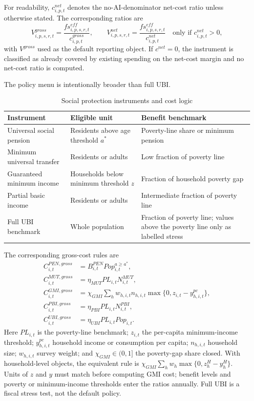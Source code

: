 \documentclass[11pt,a4paper]{article}
\begin{document}
For readability, $c^{net}_{i,p,t}$ denotes the no-AI-denominator net-cost ratio unless otherwise stated. The corresponding ratios are
\begin{equation}
    V^{gross}_{i,p,s,r,t}=\frac{fs^{eff}_{i,p,s,r,t}}{c^{gross}_{i,p,t}},
    \qquad
    V^{net}_{i,p,s,r,t}=\frac{fs^{eff}_{i,p,s,r,t}}{c^{net}_{i,p,t}}\quad\text{only if }c^{net}_{i,p,t}>0,
\end{equation}
with $V^{gross}$ used as the default reporting object. If $c^{net}=0$, the instrument is classified as already covered by existing spending on the net-cost margin and no net-cost ratio is computed.

The policy menu is intentionally broader than full UBI.

\begin{table}[H]
\centering
\caption{Social protection instruments and cost logic}
\label{tab:policy_rules}
\small
\begin{tabular}{p{}p{}p{}}
\toprule
Instrument & Eligible unit & Benefit benchmark \\
\midrule
Universal social pension & Residents above age threshold $a^*$ & Poverty-line share or minimum pension \\
Minimum universal transfer & Residents or adults & Low fraction of poverty line \\
Guaranteed minimum income & Households below minimum threshold $z$ & Fraction of household poverty gap \\
Partial basic income & Residents or adults & Intermediate fraction of poverty line \\
Full UBI benchmark & Whole population & Fraction of poverty line; values above the poverty line only as labelled stress \\
\bottomrule
\end{tabular}
\end{table}

The corresponding gross-cost rules are
\begin{align}
    C^{PEN,gross}_{i,t} &= B^{PEN}_{i,t}Pop_{i,t}^{a\geq a^*},\\
    C^{MUT,gross}_{i,t} &= \eta_{MUT}PL_{i,t}N^{MUT}_{i,t},\\
    C^{GMI,gross}_{i,t} &= \chi_{GMI}\sum_h w_{h,i,t}n_{h,i,t}\max\{0,z_{i,t}-y^{pc}_{h,i,t}\},\\
    C^{PBI,gross}_{i,t} &= \eta_{PBI}PL_{i,t}N^{PBI}_{i,t},\\
    C^{UBI,gross}_{i,t} &= \eta_{UBI}PL_{i,t}Pop_{i,t}.
\end{align}
Here $PL_{i,t}$ is the poverty-line benchmark; $z_{i,t}$ the per-capita minimum-income threshold; $y^{pc}_{h,i,t}$ household income or consumption per capita; $n_{h,i,t}$ household size; $w_{h,i,t}$ survey weight; and $\chi_{GMI}\in(0,1]$ the poverty-gap share closed. With household-level objects, the equivalent rule is $\chi_{GMI}\sum_h w_h\max\{0,z^H_h-y^H_h\}$. Units of $z$ and $y$ must match before computing GMI cost; benefit levels and poverty or minimum-income thresholds enter the ratios annually. Full UBI is a fiscal stress test, not the default policy.
\end{document}
